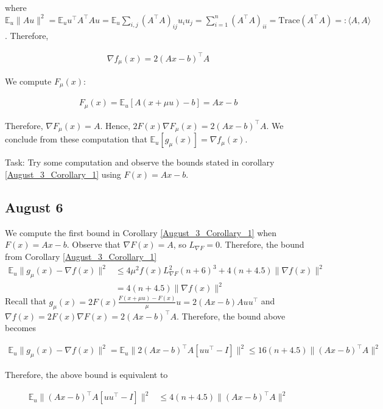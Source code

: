 \documentclass{article}
\begin{document}
where $\mathbb{E}_u\|Au\|^2 = \mathbb{E}_uu^\top A^\top Au = \mathbb{E}_u\sum_{i,j}(A^\top A)_{ij}u_iu_j = \sum_{i=1}^n(A^\top A)_{ii} = \text{Trace}(A^\top A)=: \langle A,A\rangle $. Therefore, 

\begin{align*}
\nabla f_{\mu}(x) = 2(Ax-b)^\top A
\end{align*}

We compute $F_{\mu}(x)$: 

\begin{align*}
F_{\mu}(x) = \mathbb{E}_u[A(x+\mu u)-b] = Ax-b
\end{align*}

Therefore, $\nabla F_{\mu}(x) = A$. Hence, $2F(x)\nabla F_{\mu}(x) = 2(Ax-b)^\top A$. We conclude from these computation that $\mathbb{E}_u[g_{\mu}(x)] = \nabla f_{\mu}(x)$.  \newline 

Task: Try some computation and observe the bounds stated in corollary \ref{August_3_Corollary_1} using $F(x) = Ax-b$. 

\subsection{August 6}

We compute the first bound in Corollary \ref{August_3_Corollary_1} when $F(x) = Ax-b$. Observe that $\nabla F(x) = A$, so $L_{\nabla F} = 0$. Therefore, the bound from Corollary \ref{August_3_Corollary_1}
\begin{align*}
\mathbb{E}_u\|g_{\mu}(x) - \nabla f(x)\|^2  & \leq 4\mu^2f(x)L_{\nabla F}^2(n+6)^3 + 4(n+4.5)\|\nabla f(x)\|^2 \\ & = 4(n+4.5)\|\nabla f(x)\|^2
\end{align*}
Recall that $g_{\mu}(x) = 2F(x)\frac{F(x+\mu u) - F(x)}{\mu}u = 2(Ax-b)Auu^\top$ and $\nabla f(x) = 2F(x)\nabla F(x) = 2(Ax-b)^\top A$. Therefore, the bound above becomes

\begin{align*}
\mathbb{E}_u\|g_{\mu}(x) - \nabla f(x)\|^2 = \mathbb{E}_u \| 2(Ax-b)^\top A[uu^\top - I]\|^2 \leq 16(n+4.5)\|(Ax-b)^\top A\|^2
\end{align*}

Therefore, the above bound is equivalent to

\begin{align}
\mathbb{E}_u\| (Ax-b)^\top A[uu^\top - I]\|^2 & \leq 4(n+4.5)\| (Ax-b)^\top A\|^2 \label{August_6_bound_1}
\end{align}
\end{document}
